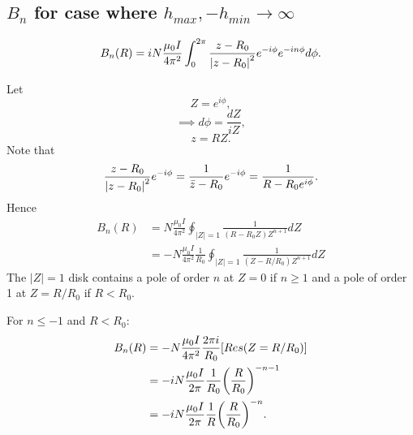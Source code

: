 \documentclass{article}
\begin{document}

\subsection{$B_{n}$ for case where $h_{max},-h_{min}\rightarrow\infty$}
\label{sec:case_where_h_max_infinite}

\[B_{n}(R) = iN\frac{\mu_0I}{4\pi^2}\int_0^{2\pi}\frac{z-R_0}{\abs{z-R_0}^2}e^{-i\phi}e^{-in\phi}d\phi.\]

Let
\[Z=e^{i\phi},\]
\[\implies d\phi = \frac{dZ}{iZ},\]
\[z=RZ.\]
Note that
\[\frac{z-R_0}{\abs{z-R_0}^2}e^{-i\phi} = \frac{1}{\bar{z} - R_0}e^{-i\phi} = \frac{1}{R-R_0e^{i\phi}}.\]
Hence
\[\begin{aligned}
B_{n}(R) &= N\frac{\mu_0I}{4\pi^2}\oint_{|Z|=1}\frac{1}{(R-R_0Z)Z^{n+1}}dZ \\
&= -N\frac{\mu_0I}{4\pi^2}\frac{1}{R_0}\oint_{|Z|=1}\frac{1}{(Z-R/R_0)Z^{n+1}}dZ
\end{aligned}\]
The $|Z|=1$ disk contains a pole of order $n$ at $Z=0$ if $n\ge 1$ and a pole of order 1 at
$Z=R/R_0$ if $R< R_0$.

For $n\le-1$ and $R< R_0$:
\[\begin{aligned}
B_{n}(R) &= -N\frac{\mu_0I}{4\pi^2}\frac{2\pi i}{R_0}\qty[Res(Z=R/R_0)] \\
&= -iN\frac{\mu_0I}{2\pi}\frac{1}{R_0}\qty(\frac{R}{R_0})^{-n-1}\\
&= -iN\frac{\mu_0I}{2\pi}\frac{1}{R}\qty(\frac{R}{R_0})^{-n}.
\end{aligned}\]
\end{document}
